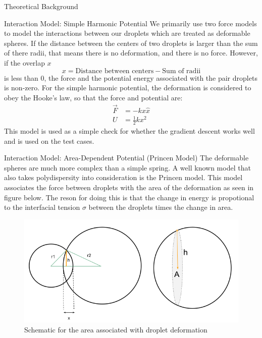 \documentclass[12pt]{article}
\begin{document}
\begin{section}{Theoretical Background}
\begin{subsection}{Interaction Model: Simple Harmonic Potential}
We primarily use two force models to model the interactions between our droplets which are treated as  deformable spheres. If the distance between the centers of two droplets is larger than the sum of there radii, that means there is no deformation, and there is no force. However, if the overlap $x$
\begin{equation}
    x = \text{Distance between centers} - \text{Sum of radii}
\end{equation}
is less than $0$, the force and the potential energy associated with the pair droplets is non-zero. 
For the simple harmonic potential, the deformation is considered to obey the Hooke's law, so that the force and potential are:
\begin{align}
    \Vec{F} &= -kx\hat{x} \\
    U &= \frac{1}{2} k x^2
\end{align}
This model is used as a simple check for whether the gradient descent works well and is used on the test cases.
\end{subsection}
\begin{subsection}{Interaction Model: Area-Dependent Potential (Princen Model)}
The deformable spheres are much more complex than a simple spring. A well known model \cite{princen1983rheology} that also takes polydispersity into consideration is the Princen model. This model associates the force between droplets with the area of the deformation as seen in figure below. The reson for doing this is that the change in energy is propotional to the interfacial tension $\sigma$ between the droplets times the change in area. 
\begin{figure}[h!]
    \centering
    \includegraphics{area_potential.jpeg}
    \caption{Schematic for the area associated with droplet deformation}
    \label{fig:my_label}
\end{figure}

\end{subsection}
\end{section}
\end{document}
